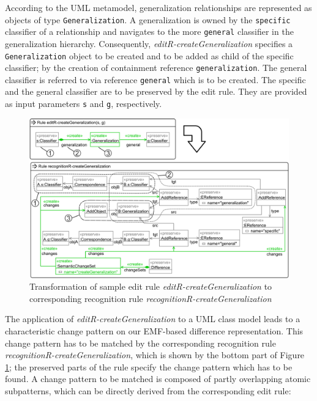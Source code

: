 \documentclass{llncs}
\begin{document}
According to the UML metamodel, generalization relationships are represented
as objects of type \texttt{Generalization}. A generalization is 
owned by the \texttt{specific} classifier of a relationship
and navigates to the more \texttt{general} classifier in the generalization 
hierarchy.
Consequently, \textit{editR-createGeneralization} specifies 
a \texttt{Generalization} object to be created and to be added 
as child of the specific classifier; by the creation of 
containment reference \texttt{generalization}. The general
classifier is referred to via reference \texttt{general} which
is to be created.
The specific and the general classifier are to be preserved 
by the edit rule. They are provided as input parameters
\texttt{s} and \texttt{g}, respectively.

\begin{figure}[h!]
  \centering
  \includegraphics[width=1.0\textwidth]{pic/editR2recognitionR-sample_v02.png}
  \caption{Transformation of sample edit rule \textit{editR-createGeneralization} to corresponding recognition rule \textit{recognitionR-createGeneralization}}
  \label{fig:sample}
\end{figure}

The application of \textit{editR-createGeneralization} to a 
UML class model leads to a characteristic change pattern on 
our EMF-based difference representation.
This change pattern has to be matched
by the corresponding recognition rule
\textit{recognitionR-createGeneralization}, which
is shown by the bottom part of Figure \ref{fig:sample};
the preserved parts of the rule specify the change pattern 
which has to be found.
A change pattern to be matched is composed
of partly overlapping atomic subpatterns, which can be directly
derived from the corresponding edit rule:
\end{document}
